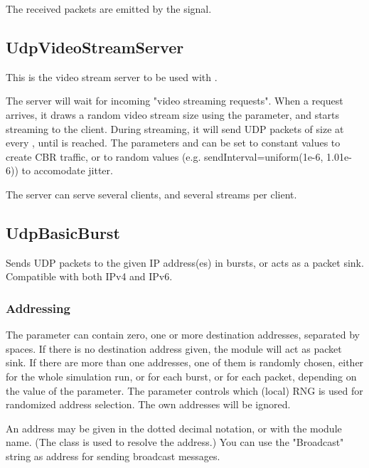 The received packets are emitted by the  signal.

\subsection{UdpVideoStreamServer}

This is the video stream server to be used with .

The server will wait for incoming "video streaming requests".
When a request arrives, it draws a random video stream size
using the  parameter, and starts streaming to the client.
During streaming, it will send UDP packets of size  at every
, until  is reached. The parameters 
and  can be set to constant values to create CBR traffic,
or to random values (e.g. sendInterval=uniform(1e-6, 1.01e-6)) to
accomodate jitter.

The server can serve several clients, and several streams per client.


\subsection{UdpBasicBurst}

Sends UDP packets to the given IP address(es) in bursts, or acts as a
packet sink. Compatible with both IPv4 and IPv6.

\subsubsection*{Addressing}

The  parameter can contain zero, one or more destination
addresses, separated by spaces. If there is no destination address given,
the module will act as packet sink. If there are more than one addresses,
one of them is randomly chosen, either for the whole simulation run,
or for each burst, or for each packet, depending on the value of the
 parameter. The  parameter controls which
(local) RNG is used for randomized address selection.
The own addresses will be ignored.

An address may be given in the dotted decimal notation, or with the module
name. (The  class is used to resolve the address.)
You can use the "Broadcast" string as address for sending broadcast messages.

